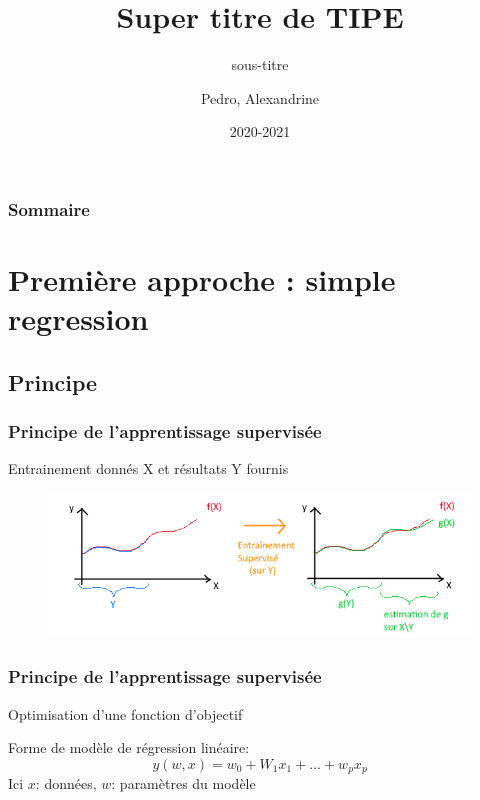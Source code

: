 \documentclass{beamer}
\title{Super titre de TIPE}
\subtitle{sous-titre}
\author{Pedro, Alexandrine }
\date{2020-2021}
\begin{document}
\begin{frame}
	\maketitle
\end{frame}

\begin{frame}
	\frametitle{Sommaire}
	\tableofcontents
\end{frame}

\section{Première approche : simple regression}
\subsection{Principe}
\begin{frame}
	\frametitle{Principe de l'apprentissage supervisée}
	Entrainement donnés X et résultats Y fournis
	\begin{figure}[b]
		\centering
		\includegraphics[scale=0.65]{super_schema}
	\end{figure}
\end{frame}

\begin{frame}
	\frametitle{Principe de l'apprentissage supervisée}
	Optimisation d'une fonction d'objectif
	
	Forme de modèle de régression linéaire:
	\[y(w,x)=w_0+W_1x_1+...+w_px_p\]
	Ici $x$: données, $w$: paramètres du modèle
\end{frame}
\end{document}
